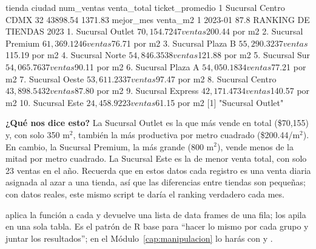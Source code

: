 \begin{rsalida}
           tienda ciudad num_ventas venta_total ticket_promedio
1 Sucursal Centro   CDMX         32    43898.54         1371.83
  mejor_mes venta_m2
1   2023-01     87.8
RANKING DE TIENDAS 2023
 1. Sucursal Outlet    $70,154.72   47 ventas   $200.44 por m2
 2. Sucursal Premium   $61,369.12   46 ventas    $76.71 por m2
 3. Sucursal Plaza B   $55,290.32   37 ventas   $115.19 por m2
 4. Sucursal Norte     $54,846.35   38 ventas   $121.88 por m2
 5. Sucursal Sur       $54,065.76   37 ventas    $90.11 por m2
 6. Sucursal Plaza A   $54,050.18   34 ventas    $77.21 por m2
 7. Sucursal Oeste     $53,611.23   37 ventas    $97.47 por m2
 8. Sucursal Centro    $43,898.54   32 ventas    $87.80 por m2
 9. Sucursal Express   $42,171.47   34 ventas   $140.57 por m2
10. Sucursal Este      $24,458.92   23 ventas    $61.15 por m2
[1] "Sucursal Outlet"
\end{rsalida}

\textbf{¿Qué nos dice esto?} La Sucursal Outlet es la que más vende en
total (\$70,155) y, con solo 350 m$^2$, también la más productiva por metro
cuadrado (\$200.44/m$^2$). En cambio, la Sucursal Premium, la más grande
(800 m$^2$), vende menos de la mitad por metro cuadrado. La Sucursal Este
es la de menor venta total, con solo 23 ventas en el año. Recuerda que en
estos datos cada registro es una venta diaria asignada al azar a una
tienda, así que las diferencias entre tiendas son pequeñas; con datos
reales, este mismo script te daría el ranking verdadero cada mes.

 aplica la función a cada  y devuelve
una lista de data frames de una fila;  los
apila en una sola tabla. Es el patrón de R base para ``hacer lo mismo por
cada grupo y juntar los resultados''; en el Módulo~\ref{cap:manipulacion}
lo harás con  y .

